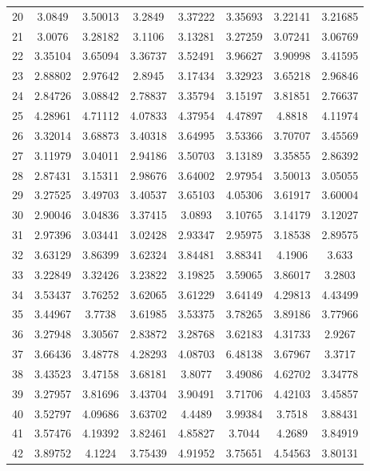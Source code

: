 \begin{center}
\begin{longtable}{cccccccc}
20 & 3.0849 & 3.50013 & 3.2849 & 3.37222 & 3.35693 & 3.22141 & 3.21685\\
21 & 3.0076 & 3.28182 & 3.1106 & 3.13281 & 3.27259 & 3.07241 & 3.06769\\
22 & 3.35104 & 3.65094 & 3.36737 & 3.52491 & 3.96627 & 3.90998 & 3.41595\\
23 & 2.88802 & 2.97642 & 2.8945 & 3.17434 & 3.32923 & 3.65218 & 2.96846\\
24 & 2.84726 & 3.08842 & 2.78837 & 3.35794 & 3.15197 & 3.81851 & 2.76637\\
25 & 4.28961 & 4.71112 & 4.07833 & 4.37954 & 4.47897 & 4.8818 & 4.11974\\
26 & 3.32014 & 3.68873 & 3.40318 & 3.64995 & 3.53366 & 3.70707 & 3.45569\\
27 & 3.11979 & 3.04011 & 2.94186 & 3.50703 & 3.13189 & 3.35855 & 2.86392\\
28 & 2.87431 & 3.15311 & 2.98676 & 3.64002 & 2.97954 & 3.50013 & 3.05055\\
29 & 3.27525 & 3.49703 & 3.40537 & 3.65103 & 4.05306 & 3.61917 & 3.60004\\
30 & 2.90046 & 3.04836 & 3.37415 & 3.0893 & 3.10765 & 3.14179 & 3.12027\\
31 & 2.97396 & 3.03441 & 3.02428 & 2.93347 & 2.95975 & 3.18538 & 2.89575\\
32 & 3.63129 & 3.86399 & 3.62324 & 3.84481 & 3.88341 & 4.1906 & 3.633\\
33 & 3.22849 & 3.32426 & 3.23822 & 3.19825 & 3.59065 & 3.86017 & 3.2803\\
34 & 3.53437 & 3.76252 & 3.62065 & 3.61229 & 3.64149 & 4.29813 & 4.43499\\
35 & 3.44967 & 3.7738 & 3.61985 & 3.53375 & 3.78265 & 3.89186 & 3.77966\\
36 & 3.27948 & 3.30567 & 2.83872 & 3.28768 & 3.62183 & 4.31733 & 2.9267\\
37 & 3.66436 & 3.48778 & 4.28293 & 4.08703 & 6.48138 & 3.67967 & 3.3717\\
38 & 3.43523 & 3.47158 & 3.68181 & 3.8077 & 3.49086 & 4.62702 & 3.34778\\
39 & 3.27957 & 3.81696 & 3.43704 & 3.90491 & 3.71706 & 4.42103 & 3.45857\\
40 & 3.52797 & 4.09686 & 3.63702 & 4.4489 & 3.99384 & 3.7518 & 3.88431\\
41 & 3.57476 & 4.19392 & 3.82461 & 4.85827 & 3.7044 & 4.2689 & 3.84919\\
42 & 3.89752 & 4.1224 & 3.75439 & 4.91952 & 3.75651 & 4.54563 & 3.80131\\

\end{longtable}
\end{center}
